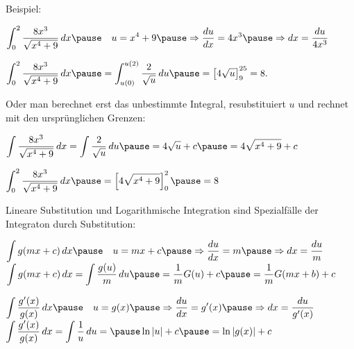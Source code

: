 \begin{frame}[fragile]
Beispiel:

$\displaystyle\int_0^2 \dfrac{8x^3}{\sqrt{x^4+9}}\,dx \pause \quad u = x^4+9  \pause \Rightarrow  \dfrac{du}{dx} =4x^3 \pause \Rightarrow dx = \dfrac{du}{4x^3}$ \pause

$\displaystyle\int_0^2 \dfrac{8x^3}{\sqrt{x^4+9}}\,dx \pause = \displaystyle\int_{u(0)}^{u(2)} \dfrac{2}{\sqrt{u}} \,du \pause
=\left[4\sqrt{u}\right]_9^{25} = 8.$  \pause

Oder man berechnet erst das unbestimmte Integral,   resubstituiert $u$ und rechnet mit den ursprünglichen Grenzen: \pause

$\displaystyle\int \dfrac{8x^3}{\sqrt{x^4+9}}\,dx = \displaystyle \int \dfrac{2}{\sqrt{u}} \,du \pause =4\sqrt{u} +c\pause  = 4\sqrt{x^4+9} + c $

$\displaystyle\int_0^2 \dfrac{8x^3}{\sqrt{x^4+9}}\,dx \pause =  \left[4\sqrt{x^4+9}\right]_0^2 \pause = 8$
\end{frame}

\begin{frame}[fragile]
Lineare Substitution und Logarithmische Integration sind Spezialfälle der Integraton durch Substitution: \pause

$\displaystyle\int g(mx+c) \,dx \pause \quad u = mx+c  \pause \Rightarrow  \dfrac{du}{dx} =m \pause \Rightarrow dx = \dfrac{du}{m} $ \\ \pause
$\displaystyle\int g(mx+c) \,dx = \displaystyle\int \dfrac{g(u)}{m} \,du \pause = \dfrac{1}{m}G(u) +c  \pause= \dfrac{1}{m}G(mx+b) + c$ \pause

$\displaystyle\int \dfrac{g^{\prime}(x)}{g(x)} \,dx \pause \quad u =g(x) \pause \Rightarrow  \dfrac{du}{dx} =g^{\prime}(x) \pause \Rightarrow dx = \dfrac{du}{g^{\prime}(x)}$ \\ \pause
 $\displaystyle\int \dfrac{g^{\prime}(x)}{g(x)} \,dx =   \displaystyle\int \dfrac{1}{u} \,du = \pause \ln\left|u\right| + c \pause = \ln\left|g(x)\right| +c$
\end{frame}

